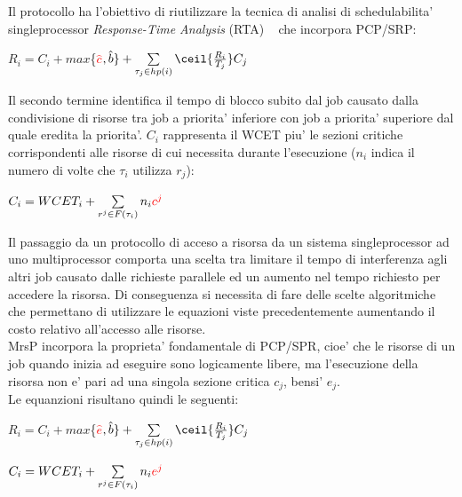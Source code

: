 Il protocollo ha l’obiettivo di riutilizzare la tecnica di analisi di schedulabilita' singleprocessor \textit{Response-Time Analysis} (RTA) ~\cite{Audsley93applyingnew} che incorpora PCP/SRP:\\

\centerline{$R_i = C_i + max$\{\textcolor{red}{$\hat{c}$}$,\hat{b}\} + \sum\limits_{\tau_j \in hp(i)} \ceil{\frac{R_i}{T_j}} C_j$}

\vspace{4 mm}

Il secondo termine identifica il tempo di blocco subito dal job causato dalla condivisione di risorse tra job a priorita’ inferiore con job a priorita’ superiore dal quale eredita la priorita’. $C_i$ rappresenta il WCET piu’ le sezioni critiche corrispondenti alle risorse di cui necessita durante l’esecuzione ($n_i$ indica il numero di volte che $\tau_i$ utilizza $r_j$):\\

\centerline{$C_i = WCET_i + \sum\limits_{r^j \in F(\tau_i)} n_i \textcolor{red}{c^j}$}

\vspace{4 mm}

Il passaggio da un protocollo di acceso a risorsa da un sistema singleprocessor ad uno multiprocessor comporta una scelta tra limitare il tempo di interferenza agli altri job causato dalle richieste parallele ed un aumento nel tempo richiesto per accedere la risorsa. Di conseguenza si necessita di fare delle scelte algoritmiche che permettano di utilizzare le equazioni viste precedentemente aumentando il costo relativo all’accesso alle risorse.\\

MrsP incorpora la proprieta’ fondamentale di PCP/SPR, cioe’ che le risorse di un job quando inizia ad eseguire sono logicamente libere, ma l’esecuzione della risorsa non e’ pari ad una singola sezione critica $c_j$, bensi’ $e_j$.\\

Le equanzioni risultano quindi le seguenti:\\

\centerline{$R_i = C_i + max$\{\textcolor{red}{$\hat{e}$}$,\hat{b}\} + \sum\limits_{\tau_j \in hp(i)} \ceil{\frac{R_i}{T_j}} C_j$}

\centerline{$C_i = WCET_i + \sum\limits_{r^j \in F(\tau_i)} n_i \textcolor{red}{e^j}$}

\vspace{4 mm}

